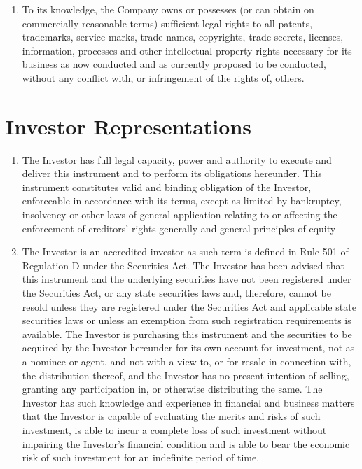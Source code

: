 \documentclass[12pt,letterpaper,fullpage]{article}
\begin{document}
\begin{enumerate}[label=(\alph*)]
\item {\begin{sloppypar}To its knowledge, the Company owns or possesses (or can obtain
    on commercially reasonable terms) sufficient legal rights to all
    patents, trademarks, service marks, trade names, copyrights, trade
    secrets, licenses, information, processes and other intellectual
    property rights necessary for its business as now conducted and as
    currently proposed to be conducted, without any conflict with, or
    infringement of the rights of, others.\end{sloppypar}}

\end{enumerate}

\section{Investor Representations}
\label{sec:investorrepresentation}

\begin{enumerate}[label=(\alph*)]

\item {\begin{sloppypar}The Investor has full legal capacity, power and authority to
    execute and deliver this instrument and to perform its obligations
    hereunder. This instrument constitutes valid and binding
    obligation of the Investor, enforceable in accordance with its
    terms, except as limited by bankruptcy, insolvency or other laws
    of general application relating to or affecting the enforcement of
    creditors’ rights generally and general principles of equity\end{sloppypar}}

\item {The Investor is an accredited investor as such term is defined
    in Rule 501 of Regulation D under the Securities Act. The Investor
    has been advised that this instrument and the underlying
    securities have not been registered under the Securities Act, or
    any state securities laws and, therefore, cannot be resold unless
    they are registered under the Securities Act and applicable state
    securities laws or unless an exemption from such registration
    requirements is available. The Investor is purchasing this
    instrument and the securities to be acquired by the Investor
    hereunder for its own account for investment, not as a nominee or
    agent, and not with a view to, or for resale in connection with,
    the distribution thereof, and the Investor has no present
    intention of selling, granting any participation in, or otherwise
    distributing the same. The Investor has such knowledge and
    experience in financial and business matters that the Investor is
    capable of evaluating the merits and risks of such investment, is
    able to incur a complete loss of such investment without impairing
    the Investor’s financial condition and is able to bear the
    economic risk of such investment for an indefinite period of
    time.}

\end{enumerate}
\end{document}
